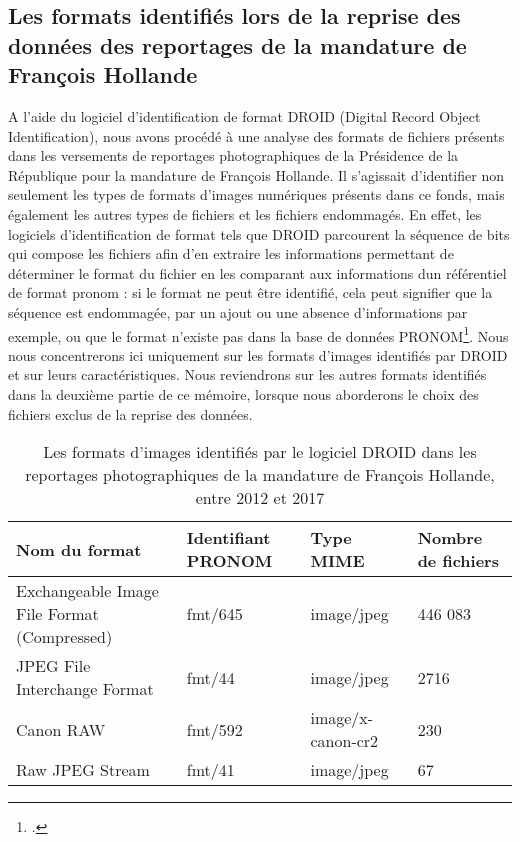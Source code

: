 \subsection*{Les formats identifiés lors de la reprise des données des reportages de la mandature de François Hollande}
A l'aide du logiciel d'identification de format DROID (Digital Record Object Identification), nous avons procédé à une analyse des formats de fichiers présents dans les versements de reportages photographiques de la Présidence de la République pour la mandature de François Hollande. Il s'agissait d'identifier non seulement les types de formats d'images numériques présents dans ce fonds, mais également les autres types de fichiers et les fichiers endommagés. En effet, les logiciels d'identification de format tels que DROID parcourent la séquence de bits qui compose les fichiers afin d'en extraire les informations permettant de déterminer le format du fichier en les comparant aux informations dun référentiel de format \gls{pronom} : si le format ne peut être identifié, cela peut signifier que la séquence est endommagée, par un ajout ou une absence d'informations par exemple, ou que le format n'existe pas dans la base de données PRONOM\footcite{pronom2024}. Nous nous concentrerons ici uniquement sur les formats d'images identifiés par DROID et sur leurs caractéristiques. Nous reviendrons sur les autres formats identifiés dans la deuxième partie de ce mémoire, lorsque nous aborderons le choix des fichiers exclus de la reprise des données.

\begin{table}[h]
\begin{tabular}{|p{5cm}|p{3cm}|p{2cm}|p{4cm}|}
    \hline
    \rowcolor{pastelpink-dark}
    \textbf{Nom du format} & \textbf{Identifiant PRONOM} & \textbf{Type MIME} & \textbf{Nombre de fichiers} \\
    \hline
    \rowcolor{pastelpink}
    Exchangeable Image File Format (Compressed) & fmt/645 & image/jpeg & 446 083 \\
    \hline
    \rowcolor{pastelpink}
     JPEG File Interchange Format & fmt/44 & image/jpeg & 2716 \\
     \hline
     \rowcolor{pastelpink}
     Canon RAW & fmt/592 & image/x-canon-cr2 & 230 \\
     \hline
     \rowcolor{pastelpink}
     Raw JPEG Stream & fmt/41 & image/jpeg & 67 \\
     \hline
 \end{tabular}
 \caption{Les formats d'images identifiés par le logiciel DROID dans les reportages photographiques de la mandature de François Hollande, entre 2012 et 2017}
 \end{table}

